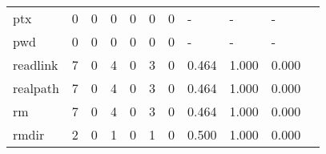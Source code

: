 \begin{longtable}{lp{1.2cm}p{1.2cm}p{1.2cm}p{1.2cm}p{1.2cm}p{1.2cm}p{1.2cm}p{1.2cm}p{1.2cm}p{1.2cm}}
ptx       &                                     0 &                                                  0 &                                                0 &                                               0 &                                                0 &                                              0 &                                                  - &                                                  - &                                                  - \\
pwd       &                                     0 &                                                  0 &                                                0 &                                               0 &                                                0 &                                              0 &                                                  - &                                                  - &                                                  - \\
readlink  &                                     7 &                                                  0 &                                                4 &                                               0 &                                                3 &                                              0 &                                              0.464 &                                              1.000 &                                              0.000 \\
realpath  &                                     7 &                                                  0 &                                                4 &                                               0 &                                                3 &                                              0 &                                              0.464 &                                              1.000 &                                              0.000 \\
rm        &                                     7 &                                                  0 &                                                4 &                                               0 &                                                3 &                                              0 &                                              0.464 &                                              1.000 &                                              0.000 \\
rmdir     &                                     2 &                                                  0 &                                                1 &                                               0 &                                                1 &                                              0 &                                              0.500 &                                              1.000 &                                              0.000 \\

\end{longtable}
